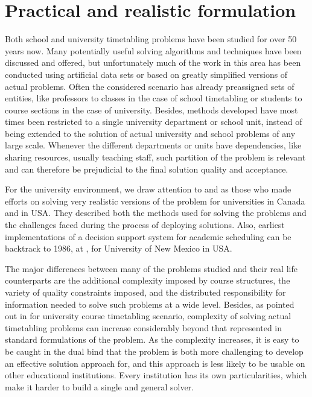 \section{Practical and realistic formulation}

Both school and university timetabling problems have been studied for over 50 years now. Many potentially useful solving algorithms and techniques have been discussed and offered, but unfortunately much of the work in this area has been conducted using artificial data sets or based on greatly simplified versions of actual problems. Often the considered scenario has already preassigned sets of entities, like professors to classes in the case of school timetabling or students to course sections in the case of university. Besides, methods developed have most times been restricted to a single university department or school unit, instead of being extended to the solution of actual university and school problems of any large scale. Whenever the different departments or units have dependencies, like sharing resources, usually teaching staff, such partition of the problem is relevant and can therefore be prejudicial to the final solution quality and acceptance.

For the university environment, we draw attention to \cite{Carter2001} and \cite{Murray2007} as those who made efforts on solving very realistic versions of the problem for universities in Canada and in USA. They described both the methods used for solving the problems and the challenges faced during the process of deploying solutions. Also, earliest implementations of a decision support system for academic scheduling can be backtrack to 1986, at \cite{AndersonDSS}, for University of New Mexico in USA. 

The major differences between many of the problems studied and their real life counterparts are the additional complexity imposed by course structures, the variety of quality constraints imposed, and the distributed responsibility for information needed to solve such problems at a wide level. Besides, as pointed out in \cite{Murray2007} for university course timetabling scenario, complexity of solving actual timetabling problems can increase considerably beyond that represented in standard formulations of the problem. As the complexity increases, it is easy to be caught in the dual bind that the problem is both more challenging to develop an effective solution approach for, and this approach is less likely to be usable on other educational institutions. Every institution has its own particularities, which make it harder to build a single and general solver.

